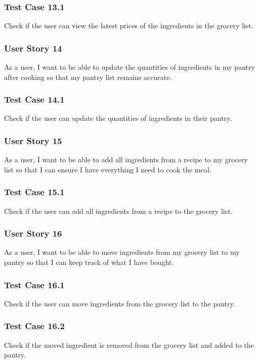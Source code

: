 \documentclass[11pt, letterpaper]{report}
\begin{document}
\subsubsection{Test Case 13.1}
Check if the user can view the latest prices of the ingredients in the grocery list.

\subsubsection{User Story 14}
As a user, I want to be able to update the quantities of ingredients in my pantry after cooking so that my pantry list remains accurate.

\subsubsection{Test Case 14.1}
Check if the user can update the quantities of ingredients in their pantry.

\subsubsection{User Story 15}
As a user, I want to be able to add all ingredients from a recipe to my grocery list so that I can ensure I have everything I need to cook the meal.

\subsubsection{Test Case 15.1}
Check if the user can add all ingredients from a recipe to the grocery list.

\subsubsection{User Story 16}
As a user, I want to be able to move ingredients from my grocery list to my pantry so that I can keep track of what I have bought.

\subsubsection{Test Case 16.1}
Check if the user can move ingredients from the grocery list to the pantry.

\subsubsection{Test Case 16.2}
Check if the moved ingredient is removed from the grocery list and added to the pantry.
\end{document}
